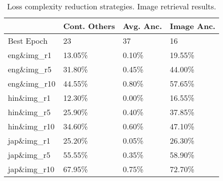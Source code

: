 \begin{table}
    \centering
\begin{tabular}{llll}
\toprule
{} & Cont. Others & Avg. Anc. & Image Anc. \\
\midrule
Best Epoch          &                            23 &                   37 &                           16 \\
\midrule
eng\&img\_r1  &                        13.05\% &                0.10\% &                       19.55\% \\
eng\&img\_r5  &                        31.80\% &                0.45\% &                       44.00\% \\
eng\&img\_r10 &                        44.55\% &                0.80\% &                       57.65\% \\
\midrule
hin\&img\_r1  &                        12.30\% &                0.00\% &                       16.55\% \\
hin\&img\_r5  &                        25.90\% &                0.40\% &                       37.85\% \\
hin\&img\_r10 &                        34.60\% &                0.60\% &                       47.10\% \\
\midrule
jap\&img\_r1  &                        25.20\% &                0.05\% &                       26.30\% \\
jap\&img\_r5  &                        55.55\% &                0.35\% &                       58.90\% \\
jap\&img\_r10 &                        67.95\% &                0.75\% &                       72.70\% \\
\bottomrule
\end{tabular}
\caption{Loss complexity reduction strategies. Image retrieval results.}
\label{table:complexity_opts_img_ret}
\end{table}
